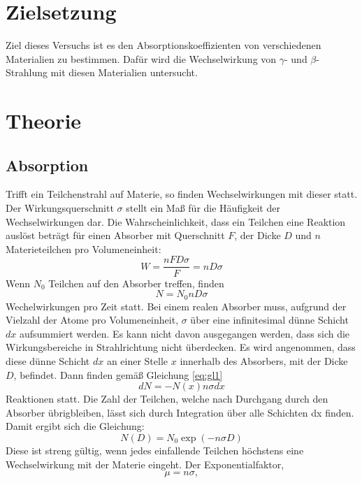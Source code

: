 \section{Zielsetzung}
Ziel dieses Versuchs ist es den Absorptionskoeffizienten von verschiedenen Materialien zu bestimmen.
Dafür wird die Wechselwirkung von $\gamma$- und $\beta$-Strahlung mit diesen Materialien untersucht.
\section{Theorie}
\label{sec:Theorie}
\subsection{Absorption}
Trifft ein Teilchenstrahl auf Materie, so finden Wechselwirkungen mit dieser statt.
Der Wirkungsquerschnitt $\sigma$ stellt ein Maß für die Häufigkeit der Wechselwirkungen dar.
Die Wahrscheinlichkeit, dass ein Teilchen eine Reaktion auslöst beträgt für einen Absorber mit Querschnitt $F$, 
der Dicke $D$ und $n$ Materieteilchen pro Volumeneinheit:
\begin{equation}
  W= \frac{nFD\sigma}{F}= nD \sigma
\end{equation}
Wenn $N_0$ Teilchen auf den Absorber treffen, finden
\begin{equation}
  N = N_0 nD \sigma
  \label{eq:gl1}
\end{equation}
Wechelwirkungen pro Zeit statt.
Bei einem realen Absorber muss, aufgrund der Vielzahl der Atome pro Volumeneinheit, $\sigma$ über eine infinitesimal dünne Schicht $dx$ aufsummiert werden.
Es kann nicht davon ausgegangen werden, dass sich die Wirkungsbereiche in Strahlrichtung nicht überdecken.
Es wird angenommen, dass diese dünne Schicht $dx$ an einer Stelle $x$ innerhalb des Absorbers, mit der Dicke $D$, befindet.
Dann finden gemäß Gleichung \eqref{eq:gl1}
\begin{equation}
  dN = -N(x) n \sigma dx
\end{equation}
Reaktionen statt.
Die Zahl der Teilchen, welche nach Durchgang durch den Absorber übrigbleiben, lässt sich durch Integration über alle Schichten dx finden.
Damit ergibt sich die Gleichung:
\begin{equation}
  N(D) = N_0 \exp(-n\sigma D)
\end{equation}
Diese ist streng gültig, wenn jedes einfallende Teilchen höchstens eine Wechselwirkung mit der Materie eingeht.
Der Exponentialfaktor,
\begin{equation}
  \mu = n \sigma,
\end{equation}
